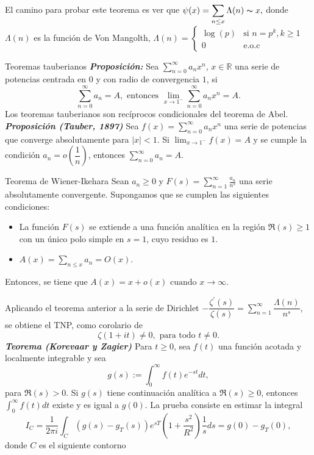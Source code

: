 \documentclass[final]{beamer}
\newcommand\R{\ensuremath{\mathbb{R}}}
\newlength{\colwidth}
\newcommand{\defi}[1]{\textbf{\emph{#1}}}
\begin{document}
\begin{frame}[t,fragile]
\begin{columns}[t]
\begin{column}{\colwidth}
\phantom{xd}\\\vspace*{0.6cm}
El camino para probar este teorema es ver que $\displaystyle\psi(x)=\sum_{n\leq x} \Lambda(n)\thicksim x,$ donde $\Lambda(n)$ es la función de Von Mangolth, $\displaystyle\Lambda(n)=\begin{cases}
    \log(p) &\text{si } n=p^k, k\geq 1\\
    0 &\text{e.o.c}
\end{cases}$
\begin{block}{Teoremas tauberianos}
\defi{Proposición: }Sea $\displaystyle \sum_{n=0}^{\infty} a_n x^n$, $x\in \R$ una serie de potencias centrada en $0$ y con radio  de convergencia $1$, si
$$\sum_{n=0}^{\infty} a_n=A,\text{ entonces } \lim_{x \to 1^-}\sum_{n=0}^{\infty} a_n x^n=A.$$
Los teoremas tauberianos son recíprocos condicionales del teorema de Abel.\\
\defi{Proposición (Tauber, 1897)} Sea $f(x)=\displaystyle\sum_{n=0}^{\infty} a_n x^n$ una serie de potencias que converge absolutamente para $|x|<1$.
Si $\lim_{x \rightarrow 1^{-}} f(x)=A$ y se cumple la condición $a_n=o\left(\dfrac{1}{n}\right)$, entonces $\displaystyle\sum_{n=0}^{\infty}a_n=A$.
\end{block}
\begin{exampleblock}{Teorema de Wiener-Ikehara}
Sean $a_n \geq 0$ y $F(s)=\displaystyle\sum_{n=1}^{\infty} \frac{a_n}{n^s}$ una serie absolutamente convergente. Supongamos que se cumplen las siguientes condiciones:
\begin{itemize}
\item La función $F(s)$ se extiende a una función analítica en la región $\Re(s) \geq 1$ con un único polo simple en $s=1$, cuyo residuo es $1$.\\
\item $A(x)=\displaystyle \sum_{n \leq x} a_n=O(x)$.
\end{itemize}
Entonces, se tiene que $A(x)=x+o(x) \text { cuando } x \rightarrow \infty \text {. }
$
\end{exampleblock}
Aplicando el teorema anterior a la serie de Dirichlet $\displaystyle-\dfrac{\zeta^{\prime}(s)}{\zeta(s)}=\sum_{n=1}^{\infty}\dfrac{\Lambda(n)}{n^s}$, se obtiene el TNP, como corolario de
$$\zeta(1+it)\neq 0, \text{ para todo } t\neq 0.$$
\defi{Teorema (Korevaar y Zagier)} Para $t \geq 0$, sea $f(t)$ una función acotada y localmente integrable y sea $$g(s):=\displaystyle\int_0^{\infty} f(t) e^{-s t} d t,$$
para $\Re(s)>0$. Si $g(s)$ tiene continuación analítica a $\Re(s) \geq 0$, entonces $\displaystyle\int_0^{\infty} f(t) d t$ existe y es igual a $g(0)$.
La prueba consiste en estimar la integral
$$I_{C}=\frac{1}{2\pi i}\int_{C}\left(g(s)-g_T(s)\right)e^{sT}\left(1+\frac{s^2}{R^2}\right)\frac{1}{s}ds=g(0)-g_T(0),$$
donde $C$ es el siguiente contorno
\begin{center}


\end{center}
\end{column}
\end{columns}
\end{frame}
\end{document}
